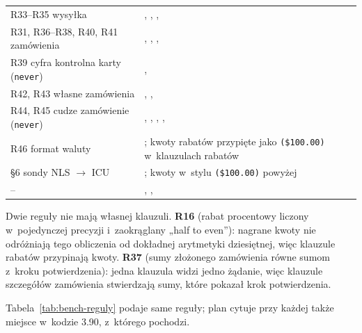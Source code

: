 {\begin{xltabular}{\linewidth}{@{}>{\raggedright\arraybackslash}p{3.9cm} >{\raggedright\arraybackslash}X@{}}
R33--R35 wysyłka & , , ,  \\
R31, R36--R38, R40, R41 zamówienia & , , ,  \\
R39 cyfra kontrolna karty (\texttt{never}) & ,  \\
R42, R43 własne zamówienia & , ,  \\
R44, R45 cudze zamówienie (\texttt{never}) & , , , ,  \\
R46 format waluty & ; kwoty rabatów przypięte jako \texttt{(\$100.00)} w~klauzulach rabatów \\
§6 sondy NLS $\rightarrow$ ICU & ; kwoty w~stylu \texttt{(\$100.00)} powyżej \\
-- & , ,  \\
\end{xltabular}
}

Dwie reguły nie mają własnej klauzuli. \textbf{R16} (rabat procentowy liczony
w~pojedynczej precyzji i~zaokrąglany „half to even”): nagrane kwoty nie odróżniają tego
obliczenia od dokładnej arytmetyki dziesiętnej, więc klauzule rabatów przypinają kwoty.
\textbf{R37} (sumy złożonego zamówienia równe sumom z~kroku potwierdzenia): jedna klauzula
widzi jedno żądanie, więc klauzule szczegółów zamówienia stwierdzają sumy, które pokazał
krok potwierdzenia.

Tabela~\ref{tab:bench-reguly} podaje same reguły; plan cytuje przy każdej także miejsce
w~kodzie 3.90, z~którego pochodzi.

